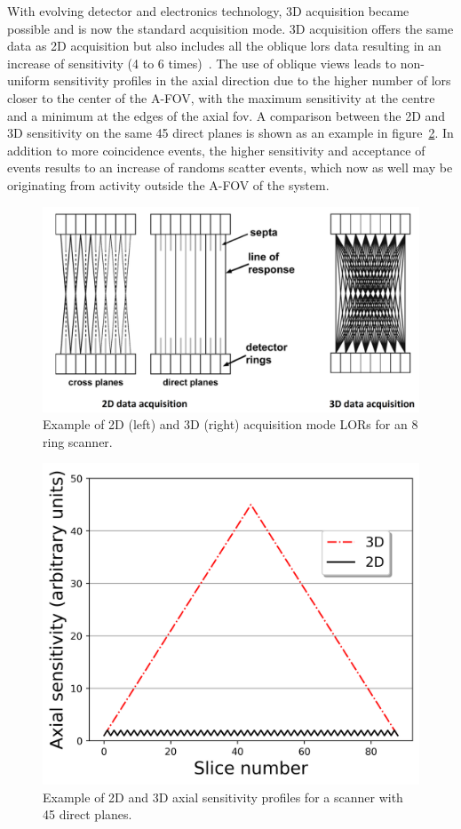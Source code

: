 With evolving detector and electronics technology, 3D acquisition became possible and is now the standard acquisition mode. 3D acquisition offers the same data as 2D acquisition but also includes all the oblique \glspl{lor} data resulting in an increase of sensitivity (4 to 6 times)~\cite{Fahey2002}. The use of oblique views leads to non-uniform sensitivity profiles in the axial direction due to the higher number of \glspl{lor} closer to the center of the A-FOV, with the maximum sensitivity at the centre and a minimum at the edges of the axial \gls{fov}. A comparison between the 2D and 3D sensitivity on the same 45 direct planes is shown as an example in figure~\ref{fig_2:2D3DSensitivityProfiles}.
In addition to more coincidence events, the higher sensitivity and acceptance of events results to an increase of randoms scatter events, which now as well may be originating from activity outside the A-FOV of the system. 
%
\begin{figure} [h!]
\centering
\includegraphics[scale=0.40,angle=0]{2_Theory_Methods/figures/Phelps_2D_3D_Acquisition.png}
\caption{Example of 2D (left) and 3D (right) acquisition mode LORs for an 8 ring scanner.} 
\label{fig_2:2D3D}
\end{figure} 
\begin{figure} [h!]
\centering
\includegraphics[scale=0.50,angle=0]{2_Theory_Methods/figures/2_2_2D3DSensitivityProfiles.png}
\caption{Example of 2D and 3D axial sensitivity profiles for a scanner with 45 direct planes.} 
\label{fig_2:2D3DSensitivityProfiles}
\end{figure} 
